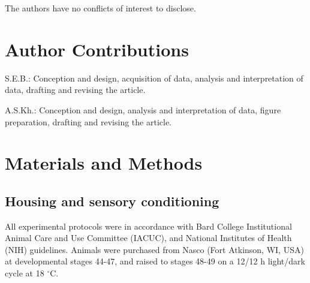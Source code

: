 \documentclass{article}
\begin{document}
The authors have no conflicts of interest to disclose.

\section*{Author Contributions}

S.E.B.: Conception and design, acquisition of data, analysis and interpretation of data, drafting and revising the article. 

A.S.Kh.: Conception and design, analysis and interpretation of data, figure preparation, drafting and revising the article.

\section*{Materials and Methods}


\subsection*{Housing and sensory conditioning}

All experimental protocols were in accordance with Bard College Institutional Animal Care and Use Committee (IACUC), and National Institutes of Health (NIH) guidelines. Animals were purchased from Nasco (Fort Atkinson, WI, USA) at developmental stages 44-47, and raised to stages 48-49 on a 12/12 h light/dark cycle at 18 $^{\circ}$C. 
\end{document}
